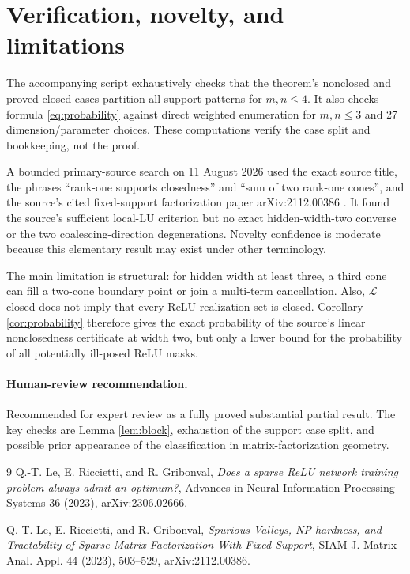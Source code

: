 \documentclass[11pt]{article}
\begin{document}
\section{Verification, novelty, and limitations}

The accompanying script exhaustively checks that the theorem's nonclosed and
proved-closed cases partition all support patterns for $m,n\le4$. It also
checks formula \eqref{eq:probability} against direct weighted enumeration for
$m,n\le3$ and 27 dimension/parameter choices. These computations verify the
case split and bookkeeping, not the proof.

A bounded primary-source search on 11 August 2026 used the exact source title,
the phrases ``rank-one supports closedness'' and ``sum of two rank-one
cones'', and the source's cited fixed-support factorization paper
arXiv:2112.00386 \cite{fsmf}. It found the source's sufficient local-LU
criterion but no exact hidden-width-two converse or the two coalescing-direction
degenerations. Novelty confidence is moderate because this elementary result
may exist under other terminology.

The main limitation is structural: for hidden width at least three, a third
cone can fill a two-cone boundary point or join a multi-term cancellation.
Also, $\mathcal L$ closed does not imply that every ReLU realization set is
closed. Corollary \ref{cor:probability} therefore gives the exact probability
of the source's linear nonclosedness certificate at width two, but only a lower
bound for the probability of all potentially ill-posed ReLU masks.

\paragraph{Human-review recommendation.}
Recommended for expert review as a fully proved substantial partial result.
The key checks are Lemma \ref{lem:block}, exhaustion of the support case split,
and possible prior appearance of the classification in matrix-factorization
geometry.

\begin{thebibliography}{9}
Q.-T. Le, E. Riccietti, and R. Gribonval,
\emph{Does a sparse ReLU network training problem always admit an optimum?},
Advances in Neural Information Processing Systems 36 (2023),
arXiv:2306.02666.

Q.-T. Le, E. Riccietti, and R. Gribonval,
\emph{Spurious Valleys, NP-hardness, and Tractability of Sparse Matrix
Factorization With Fixed Support},
SIAM J. Matrix Anal. Appl. 44 (2023), 503--529,
arXiv:2112.00386.
\end{thebibliography}
\end{document}
